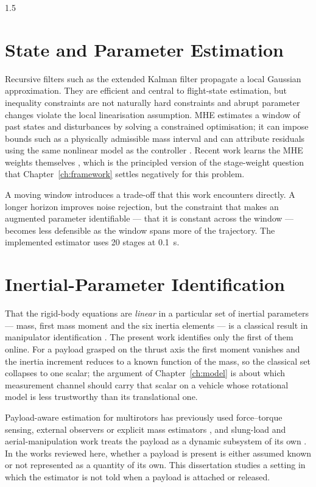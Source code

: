 \begin{spacing}{1.5}
\section{State and Parameter Estimation}

Recursive filters such as the extended Kalman filter propagate a local Gaussian
approximation. They are efficient and central to flight-state estimation, but
inequality constraints are not naturally hard constraints and abrupt parameter
changes violate the local linearisation assumption. MHE estimates a window of
past states and disturbances by solving a constrained optimisation; it can impose
bounds such as a physically admissible mass interval and can attribute residuals
using the same nonlinear model as the controller
\cite{rawlings2017mpc,rao2003}. Recent work learns the MHE weights
themselves \cite{neuromhe}, which is the principled version of the stage-weight
question that Chapter~\ref{ch:framework} settles negatively for this problem.

A moving window introduces a trade-off that this work encounters directly. A
longer horizon improves noise rejection, but the constraint that makes an
augmented parameter identifiable --- that it is constant across the window ---
becomes less defensible as the window spans more of the trajectory. The
implemented estimator uses 20 stages at \SI{0.1}{\second}.

\section{Inertial-Parameter Identification}

That the rigid-body equations are \emph{linear} in a particular set of inertial
parameters --- mass, first mass moment and the six inertia elements --- is a
classical result in manipulator identification \cite{atkeson1986}. The present
work identifies only the first of them online. For a payload grasped on the
thrust axis the first moment vanishes and the inertia increment reduces to a
known function of the mass, so the classical set collapses to one scalar; the
argument of Chapter~\ref{ch:model} is about which measurement channel should
carry that scalar on a vehicle whose rotational model is less trustworthy than
its translational one.

Payload-aware estimation for multirotors has previously used force--torque
sensing, external observers or explicit mass estimators \cite{tomic2017,
svacha2020, wuest2019, bohm2021}, and slung-load and aerial-manipulation work
treats the payload as a dynamic subsystem of its own \cite{sreenath2013,
thomas2014, ollero2022}. In the works reviewed here, whether a payload is
present is either assumed known or not represented as a quantity of its own.
This dissertation studies a setting in which the estimator is not told when a
payload is attached or released.


\end{spacing}
